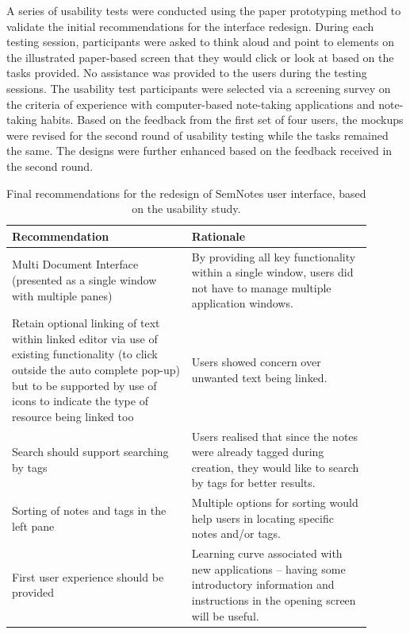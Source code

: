 A series of usability tests were conducted using the paper prototyping method to validate the initial recommendations for the interface redesign. During each testing session, participants were asked to think aloud and point to elements on the illustrated paper-based screen that they would click or look at based on the tasks provided. No assistance was provided to the users during the testing sessions. The usability test participants were selected via a screening survey on the criteria of experience with computer-based note-taking applications and note-taking habits. 
Based on the feedback from the first set of four users, the mockups were revised for the second round of usability testing while the tasks remained the same. The designs were further enhanced based on the 
feedback received in the second round. 

\begin{table}[htp]
\centering
{}
\begin{tabular}{p{0.45\linewidth} p{0.45\linewidth}}
\toprule
\textbf{Recommendation} & \textbf{Rationale} \\

\midrule
Multi Document Interface (presented as a single window with multiple panes) & By providing all key functionality within a single window, users did not have to manage multiple application windows.\\

Retain optional linking of text within linked editor via use of existing functionality (to click outside the auto complete pop-up) but to be supported by use of icons to indicate the type of resource being linked too & Users showed concern over unwanted text being linked. \\

Search should support searching by tags  & Users realised that since the notes were already tagged during creation, they would like to search by tags for better results. \\

Sorting of notes and tags in the left pane & Multiple options for sorting would help users in locating specific notes and/or tags. \\

First user experience should be provided & Learning curve associated with new applications -- having some introductory information and instructions in the opening screen will be useful. \\

\bottomrule
\end{tabular} 
\caption{Final recommendations for the redesign of SemNotes user interface, based on the usability study.}
\label{tab:sourecommendations}
\end{table}

